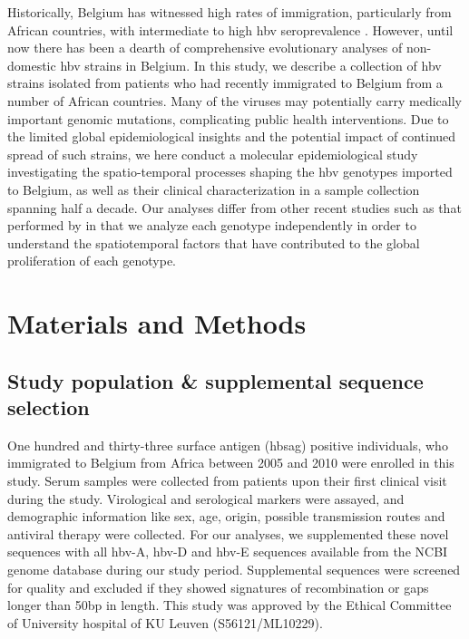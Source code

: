 Historically, Belgium has witnessed high rates of immigration, particularly from African countries, with intermediate to high \gls{hbv} seroprevalence \citep{schweitzer2015estimations}.
However, until now there has been a dearth of comprehensive evolutionary analyses of non-domestic \gls{hbv} strains in Belgium.
In this study, we describe a collection of \gls{hbv} strains isolated from patients who had recently immigrated to Belgium from a number of African countries.
Many of the viruses may potentially carry medically important genomic mutations, complicating public health interventions.
Due to the limited global epidemiological insights and the potential impact of continued spread of such strains, we here conduct a molecular epidemiological study investigating the spatio-temporal processes shaping the \gls{hbv} genotypes imported to Belgium, as well as their clinical characterization in a sample collection spanning half a decade.
Our analyses differ from other recent studies such as that performed by \citet{kocher2021ten} in that we analyze each genotype independently in order to understand the spatiotemporal factors that have contributed to the global proliferation of each genotype.


\section{Materials and Methods}
\subsection{Study population \& supplemental sequence selection}
One hundred and thirty-three surface antigen (\gls{hbsag}) positive individuals, who immigrated to Belgium from Africa between 2005 and 2010 were enrolled in this study.
Serum samples were collected from patients upon their first clinical visit during the study.
Virological and serological markers were assayed, and demographic information like sex, age, origin, possible transmission routes and antiviral therapy were collected.
For our analyses, we supplemented these novel sequences with all \gls{hbv}-A, \gls{hbv}-D and \gls{hbv}-E sequences available from the NCBI genome database \citep{sayers2022database} during our study period.
Supplemental sequences were screened for quality and excluded if they showed signatures of recombination or gaps longer than 50bp in length.
This study was approved by the Ethical Committee of University hospital of KU Leuven (S56121/ML10229).

